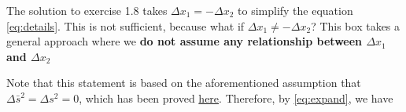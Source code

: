 \begin{tcolorbox}[
    breakable,
    parbox=false,
    colback=green!5!white,
    colframe=green!75!black,
    colbacktitle=red!30!white,
    title={Why would $\boldsymbol{M}_{0i} = 0$ for $i = 1, 2, 3$ and $\boldsymbol{M}_{ij} = -\boldsymbol{M}_{00}\delta_{ij}$ in Equation \ref{eq:expand}?}]

    \begin{tcolorbox}[
        colframe=red,
        colback=red!10,
        coltitle=black,
        colbacktitle=red!20,
        title=The answer is: \textbf{not necessarily}. We are probably looking at a wrong problem.
        \phantomsection\hypertarget{wrong-postulate}
    ]
        The solution to exercise 1.8 takes $\Delta x_1 = -\Delta x_2$ to simplify the equation \ref{eq:details}. This is not sufficient, because what if $\Delta x_1 \ne -\Delta x_2$? This box takes a general approach where we \textbf{do not assume any relationship between $\Delta x_1$ and $\Delta x_2$}
    \end{tcolorbox}

    Note that this statement is based on the aforementioned assumption that $\Delta \bar{s}^2 = \Delta s^2 = 0$, which has been proved \hyperlink{zero-interval}{here}. Therefore, by \ref{eq:expand}, we have


\end{tcolorbox}

